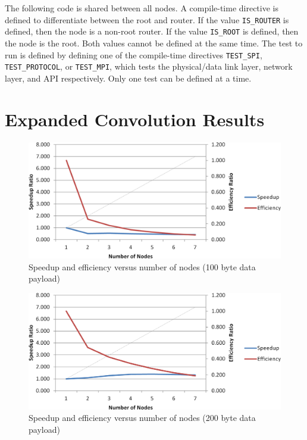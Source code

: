 \begin{appendices}
The following code is shared between all nodes. A compile-time directive is defined to differentiate between the root and router. If the value \lstinline$IS_ROUTER$ is defined, then the node is a non-root router. If the value \lstinline$IS_ROOT$ is defined, then the node is the root. Both values cannot be defined at the same time. The test to run is defined by defining one of the compile-time directives \lstinline$TEST_SPI$, \lstinline$TEST_PROTOCOL$, or \lstinline$TEST_MPI$, which tests the physical/data link layer, network layer, and API respectively. Only one test can be defined at a time.

\begin{landscape}
\lstset{tabsize=2}

\end{landscape}

\chapter{Expanded Convolution Results}\label{sec:appendix:mpi_results}

\begin{figure}[ptb]
	\begin{centering}
		\includegraphics[width=6in]{Appendices/Figures/appendices-convolution_results_100.png}
		\caption{Speedup and efficiency versus number of nodes (100 byte data payload)}
		\label{fig:appendices:convolution_results_100}
	\end{centering}
\end{figure}

\begin{figure}[ptb]
	\begin{centering}
		\includegraphics[width=6in]{Appendices/Figures/appendices-convolution_results_200.png}
		\caption{Speedup and efficiency versus number of nodes (200 byte data payload)}
		\label{fig:appendices:convolution_results_200}
	\end{centering}
\end{figure}


\end{appendices}
